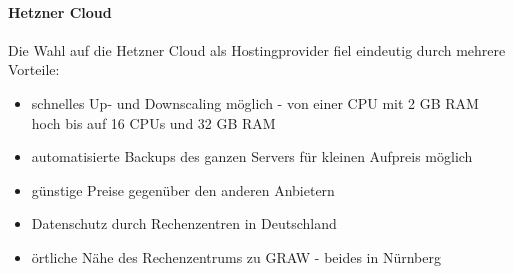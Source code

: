 \paragraph{Hetzner Cloud}
Die Wahl auf die Hetzner Cloud als Hostingprovider fiel eindeutig durch mehrere Vorteile:
\begin{itemize}
    \item schnelles Up- und Downscaling möglich - von einer CPU mit 2 GB RAM hoch bis auf 16 CPUs und 32 GB RAM
    \item automatisierte Backups des ganzen Servers für kleinen Aufpreis möglich
    \item günstige Preise gegenüber den anderen Anbietern
    \item Datenschutz durch Rechenzentren in Deutschland
    \item örtliche Nähe des Rechenzentrums zu GRAW - beides in Nürnberg
\end{itemize}

